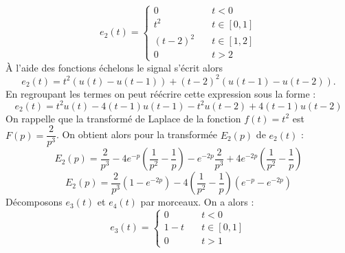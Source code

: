 \begin{figure}[!h]
    \centering
    
\end{figure}
\[
e_2(t)=
\begin{cases}
    0&\quad t<0\\
    t^2&\quad t\in[0,1]\\
    (t-2)^2&\quad t\in[1,2]\\
    0&\quad t>2
\end{cases}
\]
\`A l'aide des fonctions échelons le signal s'écrit alors 
\[
    e_2(t)=t^2\left(u(t)-u(t-1)\right)+(t-2)^2\left(u(t-1)-u(t-2)\right).
\]
En regroupant les termes on peut réécrire cette expression sous la forme :
\[
    e_2(t)=t^2u(t)-4(t-1)u(t-1)-t^2u(t-2)+4(t-1)u(t-2)
\]
On rappelle que la transformé de Laplace de la fonction $f(t)=t^2$ 
est $F(p)=\dfrac{2}{p^3}$. On obtient alors pour la transformée 
$E_2(p)$ de $e_2(t)$ :
\[
    E_2(p)=\dfrac{2}{p^3}-4e^{-p}\left(\dfrac{1}{p^2}-\dfrac{1}{p}\right)
        -e^{-2p}\dfrac{2}{p^3}+4e^{-2p}\left(\dfrac{1}{p^2}-\dfrac{1}{p}\right)
\]
\[
    E_2(p)=\dfrac{2}{p^3}\left(1-e^{-2p}\right)
        -4\left(\dfrac{1}{p^2}-\dfrac{1}{p}\right)\left(e^{-p}-e^{-2p}\right)
\]
Décomposons $e_3(t)$ et $e_4(t)$ par morceaux. On a alors :
\[
e_3(t)=
\begin{cases}
    0&\quad t<0\\
    1-t&\quad t\in[0,1]\\
    0&\quad t>1
\end{cases}
\]
